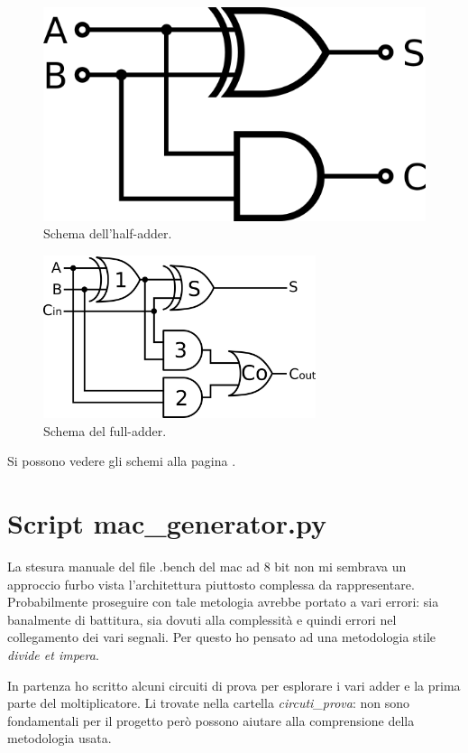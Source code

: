 \documentclass[12pt, letterpaper]{article}
\begin{document}
\begin{figure}
\centering
\includegraphics{half_adder}
\caption{Schema dell'half-adder.}
\end{figure}

\begin{figure}
\centering
\includegraphics[width=8cm]{full_adder}
\caption{Schema del full-adder.}
\end{figure}

Si possono vedere gli schemi alla pagina \pageref{rca}.

\section{Script mac\_generator.py}

La stesura manuale del file .bench del mac ad 8 bit non mi sembrava un approccio furbo vista l'architettura piuttosto complessa da rappresentare. Probabilmente proseguire con tale metologia avrebbe portato a vari errori: sia banalmente di battitura, sia dovuti alla complessità e quindi errori nel collegamento dei vari segnali. Per questo ho pensato ad una metodologia stile \textit{divide et impera}.

In partenza ho scritto alcuni circuiti di prova per esplorare i vari adder e la prima parte del moltiplicatore.
Li trovate nella cartella \textit{circuti\_prova}: non sono fondamentali per il progetto però possono aiutare alla comprensione della metodologia usata.
\end{document}

